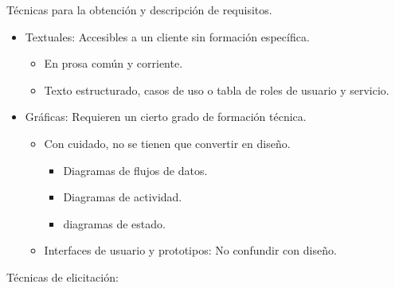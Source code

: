 \documentclass[12pt, twoside, openright]{report} %
\begin{document}
	Técnicas para la obtención y descripción de requisitos.
    \begin{itemize}
		\item
		Textuales: Accesibles a un cliente sin formación específica.
		\begin{itemize}
			\item
				En prosa común y corriente.
			\item
				Texto estructurado, casos de uso o tabla de roles de usuario y
				servicio.
		\end{itemize}
		\item Gráficas: Requieren un cierto grado de formación técnica.
			\begin{itemize}
			\item Con cuidado, no se tienen que convertir en diseño.
					\begin{itemize}
						\item
						Diagramas de flujos de datos.
						\item
						Diagramas de actividad.
						\item
						diagramas de estado.
					\end{itemize}
			\item Interfaces de usuario y prototipos: No confundir con diseño.
			\end{itemize}
	\end{itemize}


	Técnicas de elicitación:
\end{document}
